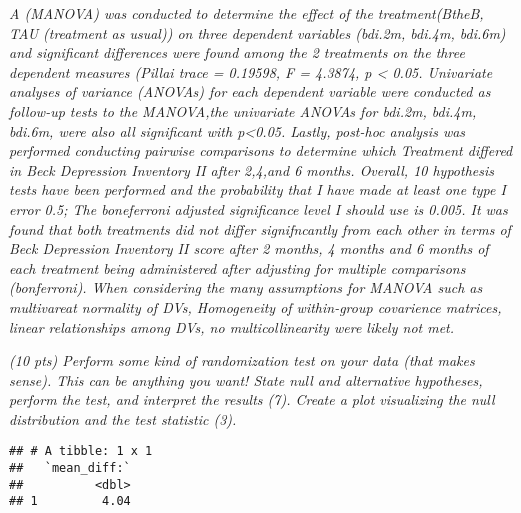 \documentclass[
]{article}
\newenvironment{Shaded}{\begin{snugshade}}{\end{snugshade}}
\newcommand{\DataTypeTok}[1]{\textcolor[rgb]{0.13,0.29,0.53}{#1}}
\newcommand{\KeywordTok}[1]{\textcolor[rgb]{0.13,0.29,0.53}{\textbf{#1}}}
\newcommand{\NormalTok}[1]{#1}
\newcommand{\OperatorTok}[1]{\textcolor[rgb]{0.81,0.36,0.00}{\textbf{#1}}}
\newcommand{\StringTok}[1]{\textcolor[rgb]{0.31,0.60,0.02}{#1}}
\begin{document}
\emph{A (MANOVA) was conducted to determine the effect of the
treatment(BtheB, TAU (treatment as usual)) on three dependent variables
(bdi.2m, bdi.4m, bdi.6m) and significant differences were found among
the 2 treatments on the three dependent measures (Pillai trace =
0.19598, F = 4.3874, p \textless{} 0.05. Univariate analyses of variance
(ANOVAs) for each dependent variable were conducted as follow-up tests
to the MANOVA,the univariate ANOVAs for bdi.2m, bdi.4m, bdi.6m, were
also all significant with p\textless0.05. Lastly, post-hoc analysis was
performed conducting pairwise comparisons to determine which Treatment
differed in Beck Depression Inventory II after 2,4,and 6 months.
Overall, 10 hypothesis tests have been performed and the probability
that I have made at least one type I error 0.5; The boneferroni adjusted
significance level I should use is 0.005. It was found that both
treatments did not differ signifncantly from each other in terms of Beck
Depression Inventory II score after 2 months, 4 months and 6 months of
each treatment being administered after adjusting for multiple
comparisons (bonferroni). When considering the many assumptions for
MANOVA such as multivareat normality of DVs, Homogeneity of within-group
covarience matrices, linear relationships among DVs, no
multicollinearity were likely not met. }

\emph{(10 pts) Perform some kind of randomization test on your data
(that makes sense). This can be anything you want! State null and
alternative hypotheses, perform the test, and interpret the results (7).
Create a plot visualizing the null distribution and the test statistic
(3).}

\begin{Shaded}
\end{Shaded}

\begin{verbatim}
## # A tibble: 1 x 1
##   `mean_diff:`
##          <dbl>
## 1         4.04
\end{verbatim}
\end{document}
